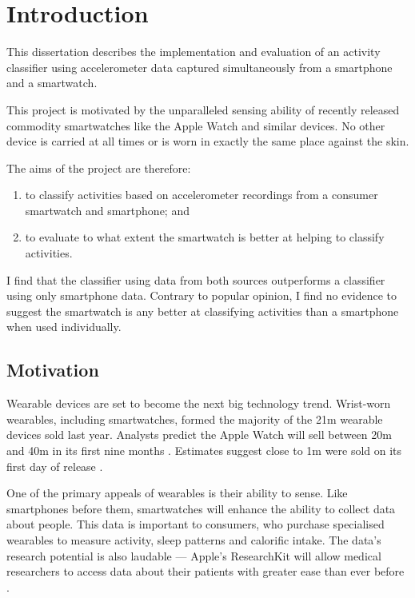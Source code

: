 \chapter{Introduction}
  This dissertation describes the implementation and evaluation of an activity classifier using 
  accelerometer data captured simultaneously from a smartphone and a smartwatch.
  
  This project is motivated by the unparalleled sensing ability of recently released commodity 
  smartwatches like the Apple Watch and similar devices. No other device is carried at all times or is worn in exactly the same place against the skin.  
  
  The aims of the project are therefore:
  \begin{enumerate}
    \item to classify activities based on accelerometer recordings from a consumer smartwatch and smartphone; and
    \item to evaluate to what extent the smartwatch is better at helping to classify activities.
  \end{enumerate}
  
  I find that the classifier using data from both sources outperforms a classifier using only smartphone data. Contrary to popular opinion, I find no evidence to suggest the smartwatch is any better at classifying activities than a smartphone when used individually.
  \section{Motivation}
  \label{sec:intro-motivation}
    Wearable devices are set to become the next big technology trend. Wrist-worn wearables, 
    including smartwatches, formed the majority of the 21m wearable devices sold last year. Analysts
    predict the Apple Watch will sell between 20m and 40m in its first nine months 
    \cite{econapplewatch}. Estimates suggest close to 1m were sold on its first day of release
    \cite{slice2015applewatch}.
    
    One of the primary appeals of wearables is their ability to sense. Like smartphones before them,
    smartwatches will enhance the ability to collect data about people. This data is important to
    consumers, who purchase specialised wearables to measure activity, sleep patterns and 
    calorific intake. The data's research potential is also laudable --- Apple's ResearchKit will
    allow medical researchers to access data about their patients with greater ease than ever
    before \cite{appleresearchkit, digitalhealth}.
    
